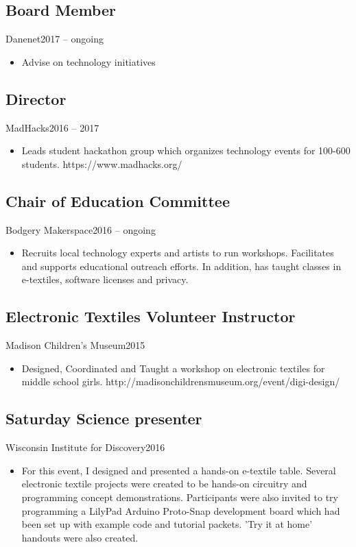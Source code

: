 \documentclass[../main.tex]{subfiles}
\begin{document}

\subsection{Board Member}{Danenet}{2017 -- ongoing}{}
\begin{itemize}
		\item{Advise on technology initiatives}
\end{itemize}

\subsection{Director}{MadHacks}{2016 -- 2017}{}
\begin{itemize}
		\item{Leads student hackathon group which organizes technology events for 100-600 students. https://www.madhacks.org/}
	\end{itemize}

\subsection{Chair of Education Committee}{Bodgery Makerspace}{2016 -- ongoing}{}
\begin{itemize}
		\item{Recruits local technology experts and artists to run workshops. Facilitates and supports educational outreach efforts. In addition, has taught classes in e-textiles, software licenses and privacy.}
	\end{itemize}

\subsection{Electronic Textiles Volunteer Instructor}{Madison Children's Museum}{2015}{}
\begin{itemize}
		\item{Designed, Coordinated and Taught a workshop on electronic textiles for middle school girls. http://madisonchildrensmuseum.org/event/digi-design/}
	\end{itemize}

\subsection{Saturday Science presenter}{Wisconsin Institute for Discovery}{2016}{}
\begin{itemize}
		\item{For this event, I designed and presented a hands-on e-textile table. Several electronic textile projects were created to be hands-on circuitry and programming concept demonstrations. Participants were also invited to try programming a LilyPad Arduino Proto-Snap development board which had been set up with example code and tutorial packets. 'Try it at home' handouts were also created.}
	\end{itemize}
\end{document}
